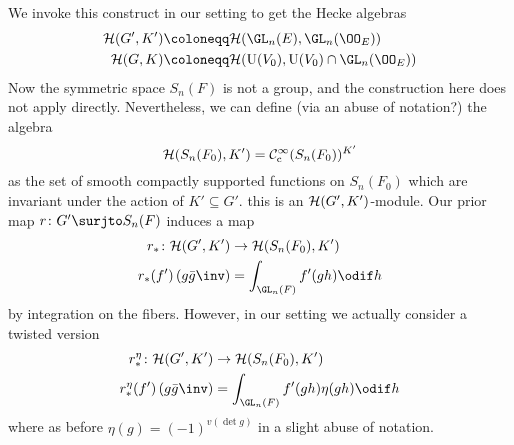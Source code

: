 We invoke this construct in our setting to get the Hecke algebras
\begin{align*}
  \HH(G', K') &\coloneqq \HH(\GL_n(E), \GL_n(\OO_E)) \\
  \HH(G, K) &\coloneqq \HH(\U(V_0), \U(V_0) \cap \GL_n(\OO_E))
\end{align*}
Now the symmetric space $S_n(F)$ is not a group,
and the construction here does not apply directly.
Nevertheless, we can define (via an abuse of notation?) the algebra
\[ \mathcal H(S_n(F_0), K') = \mathcal C_{\mathrm{c}}^{\infty}(S_n(F_0))^{K'} \]
as the set of smooth compactly supported functions on $S_n(F_0)$
which are invariant under the action of $K' \subseteq G'$.
this is an $\mathcal H(G', K')$-module.
Our prior map $r \colon G' \surjto S_n(F)$ induces a map
\begin{align*}
  r_\ast \colon \HH(G', K') &\to \HH(S_n(F_0), K') \\
  r_\ast(f')\left( g\bar{g}\inv \right) &= \int_{\GL_n(F)} f'(gh) \odif h
\end{align*}
by integration on the fibers.
However, in our setting we actually consider a twisted version
\begin{align*}
  r_\ast^\eta \colon \HH(G', K') &\to \HH(S_n(F_0), K') \\
  r_\ast^\eta(f')\left( g\bar{g}\inv \right) &= \int_{\GL_n(F)} f'(gh) \eta(gh) \odif h
\end{align*}
where as before $\eta(g) = (-1)^{v(\det g)}$ in a slight abuse of notation.
